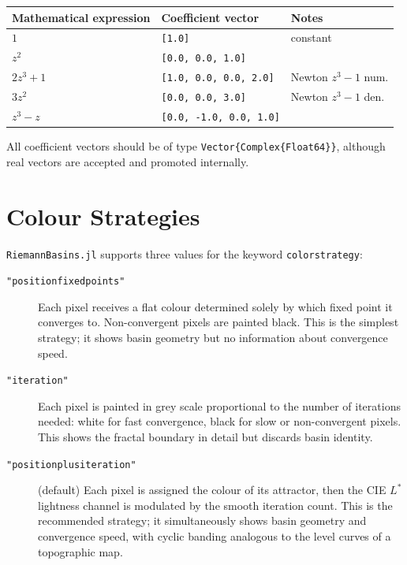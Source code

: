 \documentclass[11pt,a4paper]{article}
\theoremstyle{definition}
\newcommand{\pkg}[1]{\texttt{#1}}
\newcommand{\opt}[1]{\texttt{#1}}
\begin{document}
\begin{center}
\begin{tabular}{lll}
\toprule
Mathematical expression & Coefficient vector & Notes \\
\midrule
$1$                    & \texttt{[1.0]}                        & constant \\
$z^2$                  & \texttt{[0.0, 0.0, 1.0]}             & \\
$2z^3 + 1$             & \texttt{[1.0, 0.0, 0.0, 2.0]}        & Newton $z^3-1$ num. \\
$3z^2$                 & \texttt{[0.0, 0.0, 3.0]}             & Newton $z^3-1$ den. \\
$z^3 - z$              & \texttt{[0.0, -1.0, 0.0, 1.0]}       & \\
\bottomrule
\end{tabular}
\end{center}

All coefficient vectors should be of type \texttt{Vector\{Complex\{Float64\}\}},
although real vectors are accepted and promoted internally.

\section{Colour Strategies}

\pkg{RiemannBasins.jl} supports three values for the keyword \opt{colorstrategy}:

\begin{description}
  \item[\texttt{"positionfixedpoints"}]
    Each pixel receives a flat colour determined solely by which fixed point
    it converges to.  Non-convergent pixels are painted black.
    This is the simplest strategy; it shows basin geometry but no
    information about convergence speed.

  \item[\texttt{"iteration"}]
    Each pixel is painted in grey scale proportional to the number of
    iterations needed: white for fast convergence, black for slow or
    non-convergent pixels.  This shows the fractal boundary in detail but
    discards basin identity.

  \item[\texttt{"positionplusiteration"}] (default)
    Each pixel is assigned the colour of its attractor, then the CIE $L^*$
    lightness channel is modulated by the smooth iteration count.
    This is the recommended strategy; it simultaneously shows basin geometry
    and convergence speed, with cyclic banding analogous to the level curves
    of a topographic map.
\end{description}
\end{document}
